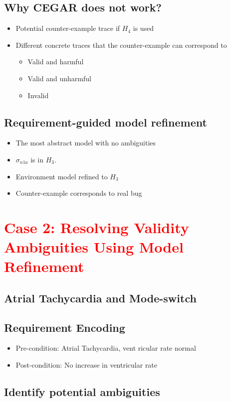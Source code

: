 \documentclass{llncs}
\begin{document}
\subsection{Why CEGAR does not work?}
\begin{itemize}
	\item Potential counter-example trace if $H_4$ is used
    \item Different concrete traces that the counter-example can correspond to
    
    \begin{itemize}
    	\item Valid and harmful
        \item Valid and unharmful
        \item Invalid
    \end{itemize}
\end{itemize}
\subsection{Requirement-guided model refinement}
\begin{itemize}
	\item The most abstract model with no ambiguities
    \item $\sigma_{n1a}$ is in $H_3$.
    \item Environment model refined to $H_3$
    \item Counter-example corresponds to real bug
\end{itemize}

\section{\textcolor{red}{Case 2: Resolving Validity Ambiguities Using Model Refinement}}
\subsection{Atrial Tachycardia and Mode-switch}
\subsection{Requirement Encoding}
\begin{itemize}
	\item Pre-condition: Atrial Tachycardia, vent  ricular rate normal
    \item Post-condition: No increase in ventricular rate
\end{itemize}
\subsection{Identify potential ambiguities}
\end{document}
